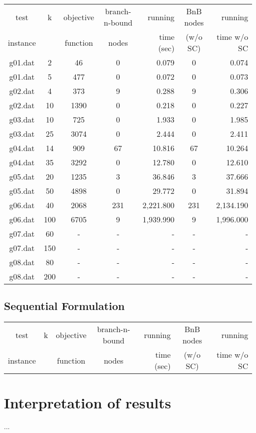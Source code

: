 \documentclass[,%
			paper=a4,%
			DIV14,
			liststotoc,
			bibtotoc,
			draft=false,%
			numbers=noendperiod
			]{scrartcl}
\begin{document}
\begin{tabular}{||c||cccr|cr||}
\hline
test     & k & objective  & branch-n-bound & running   & BnB nodes & running\\
instance &   & function   & nodes          & time (sec)& (w/o SC)  & time w/o SC \\
\hline
g01.dat	&	2	&	46	&	0	&	0.079	&	0	&	0.074	\\
g01.dat	&	5	&	477	&	0	&	0.072	&	0	&	0.073	\\
g02.dat	&	4	&	373	&	9	&	0.288	&	9	&	0.306	\\
g02.dat	&	10	&	1390	&	0	&	0.218	&	0	&	0.227	\\
g03.dat	&	10	&	725	&	0	&	1.933	&	0	&	1.985	\\
g03.dat	&	25	&	3074	&	0	&	2.444	&	0	&	2.411	\\
g04.dat	&	14	&	909	&	67	&	10.816	&	67	&	10.264	\\
g04.dat	&	35	&	3292	&	0	&	12.780	&	0	&	12.610	\\
g05.dat	&	20	&	1235	&	3	&	36.846	&	3	&	37.666	\\
g05.dat	&	50	&	4898	&	0	&	29.772	&	0	&	31.894	\\
g06.dat	&	40	&	2068	&	231	&	2,221.800	&	231	&	2,134.190	\\
g06.dat	&	100	&	6705	&	9	&	1,939.990	&	9	&	1,996.000	\\
g07.dat	&	60	&	-	&	-	&	-	&	-	&	-	\\
g07.dat	&	150	&	-	&	-	&	-	&	-	&	-	\\
g08.dat	&	80	&	-	&	-	&	-	&	-	&	-	\\
g08.dat	&	200	&	-	&	-	&	-	&	-	&	-	\\
\hline
\end{tabular}



\subsection{Sequential Formulation}

\begin{tabular}{||c||cccr|cr||}
\hline
test     & k & objective  & branch-n-bound & running   & BnB nodes & running\\
instance &   & function   & nodes          & time (sec)& (w/o SC)  & time w/o SC \\
\hline
\hline
\end{tabular}

\section{Interpretation of results}
...
\end{document}
